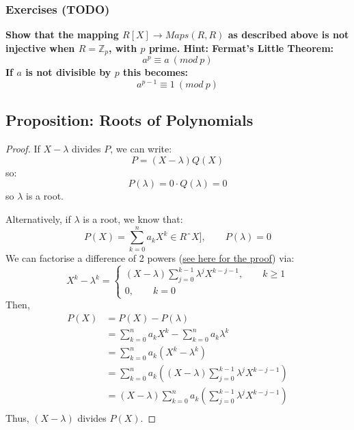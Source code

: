 \documentclass{exam}
\begin{document}
\subsubsection{Exercises (TODO)}

\begin{questions}

\question \textbf{Show that the mapping $R[X] \to Maps(R,R)$ as described above is not injective when $R = \mathbb{Z}_p$, with $p$ prime. Hint: Fermat's Little Theorem:
\[
a^p \equiv a \ (mod \ p)
\]
If $a$ is not divisible by $p$ this becomes:
\[
a^{p-1} \equiv 1 \ (mod \ p)
\]}

\end{questions}

\subsection{Proposition: Roots of Polynomials}


\begin{proof}

If $X - \lambda$ divides $P$, we can write:
\[
P = (X - \lambda)Q(X)
\]
so:
\[
P(\lambda) = 0 \cdot Q(\lambda) = 0
\]
so $\lambda$ is a root.

\bigskip

Alternatively, if $\lambda$ is a root, we know that:
\[
P(X) = \sum_{k = 0}^n a_kX^k \in RˆX], \qquad P(\lambda) = 0
\]
We can factorise a difference of 2 powers (\href{https://proofwiki.org/wiki/Difference_of_Two_Powers}{see here for the proof}) via:
\[
X^k - \lambda^k
=
\begin{cases}
(X - \lambda)\sum_{j = 0}^{k - 1} \lambda^j X^{k - j -1}, \qquad k \geq 1 \\
0, \qquad k = 0
\end{cases}
\]
Then,
\begin{align*}
    P(X) &= P(X) - P(\lambda) \\
         &= \sum_{k = 0}^n a_kX^k - \sum_{k = 0}^n a_k\lambda ^k \\
         &= \sum_{k = 0}^n a_k(X^k - \lambda ^k) \\
         &= \sum_{k = 0}^n a_k((X - \lambda)\sum_{j = 0}^{k - 1} \lambda^j X^{k - j -1}) \\
         &= (X - \lambda)\sum_{k = 0}^n a_k\left(\sum_{j = 0}^{k - 1} \lambda^j X^{k - j -1}\right) \\
\end{align*}
Thus, $(X - \lambda)$ divides $P(X)$.

\end{proof}
\end{document}
